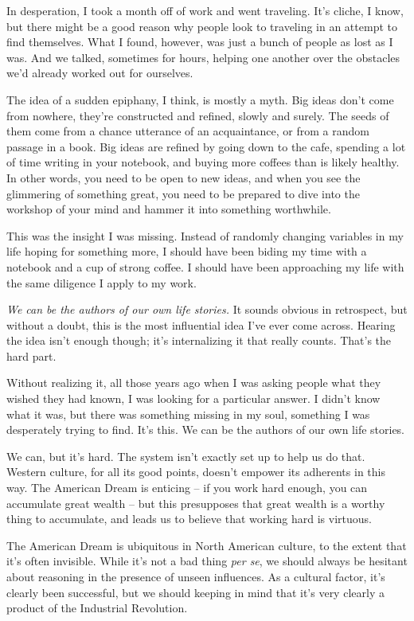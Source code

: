 \documentclass[]{book}
\newcommand{\foreign}[1]{\textit{#1}}
\begin{document}
In desperation, I took a month off of work and went traveling. It's cliche, I
know, but there might be a good reason why people look to traveling in an
attempt to find themselves. What I found, however, was just a bunch of people as
lost as I was. And we talked, sometimes for hours, helping one another over the
obstacles we'd already worked out for ourselves.

The idea of a sudden epiphany, I think, is mostly a myth. Big ideas don't come
from nowhere, they're constructed and refined, slowly and surely. The seeds of
them come from a chance utterance of an acquaintance, or from a random passage
in a book. Big ideas are refined by going down to the cafe, spending a lot of
time writing in your notebook, and buying more coffees than is likely healthy.
In other words, you need to be open to new ideas, and when you see the
glimmering of something great, you need to be prepared to dive into the workshop
of your mind and hammer it into something worthwhile.

This was the insight I was missing. Instead of randomly changing variables in my
life hoping for something more, I should have been biding my time with a
notebook and a cup of strong coffee. I should have been approaching my life with
the same diligence I apply to my work.

\emph{We can be the authors of our own life stories.} It sounds obvious in
retrospect, but without a doubt, this is the most influential idea I've ever
come across. Hearing the idea isn't enough though; it's internalizing it that
really counts. That's the hard part.

Without realizing it, all those years ago when I was asking people what they
wished they had known, I was looking for a particular answer. I didn't know what
it was, but there was something missing in my soul, something I was desperately
trying to find. It's this. We can be the authors of our own life stories.

We can, but it's hard. The system isn't exactly set up to help us do that.
Western culture, for all its good points, doesn't empower its adherents in this
way.  The American Dream is enticing -- if you work hard
enough, you can accumulate great wealth -- but this presupposes that great
wealth is a worthy thing to accumulate, and leads us to believe that working
hard is virtuous.

The American Dream is ubiquitous in North American culture, to the extent that
it's often invisible. While it's not a bad thing \foreign{per se}, we should
always be hesitant about reasoning in the presence of unseen influences. As a
cultural factor, it's clearly been successful, but we should keeping in mind
that it's very clearly a product of the Industrial Revolution.
\end{document}
